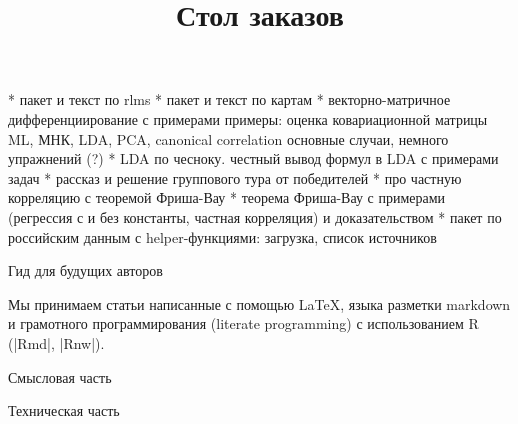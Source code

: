 \documentclass[final,pdftex]{../../template/epsilonj}
\begin{document}
\setcounter{page}{59}

\begin{frontmatter}
\title{Стол заказов}

\begin{aug}
\author{ }%



\end{aug}



\end{frontmatter}




* пакет и текст по rlms
* пакет и текст по картам
* векторно-матричное дифференциирование с примерами 
примеры: оценка ковариационной матрицы ML, МНК, LDA, PCA, canonical correlation
основные случаи, немного упражнений (?)
* LDA по чесноку. честный вывод формул в LDA с примерами задач
* рассказ и решение группового тура от победителей
* про частную корреляцию с теоремой Фриша-Вау
* теорема Фриша-Вау с примерами (регрессия с и без константы, частная корреляция) и доказательством
* пакет по российским данным с helper-функциями: загрузка, список источников


Гид для будущих авторов

Мы принимаем статьи написанные с помощью \LaTeX, языка разметки markdown и грамотного программирования (literate programming) с использованием R (\code|Rmd|, \code|Rnw|). 


Смысловая часть


Техническая часть
\end{document}
